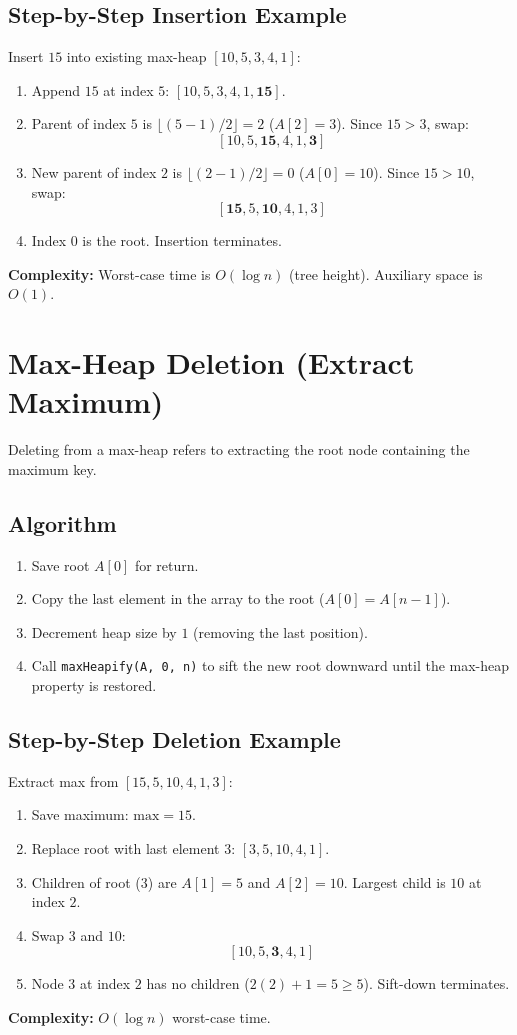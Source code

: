 \subsection{Step-by-Step Insertion Example}
Insert $15$ into existing max-heap $[10, 5, 3, 4, 1]$:
\begin{enumerate}
    \item Append $15$ at index $5$: $[10, 5, 3, 4, 1, \mathbf{15}]$.
    \item Parent of index $5$ is $\lfloor(5-1)/2\rfloor = 2$ ($A[2] = 3$). Since $15 > 3$, swap:
    \[
    [10, 5, \mathbf{15}, 4, 1, \mathbf{3}]
    \]
    \item New parent of index $2$ is $\lfloor(2-1)/2\rfloor = 0$ ($A[0] = 10$). Since $15 > 10$, swap:
    \[
    [\mathbf{15}, 5, \mathbf{10}, 4, 1, 3]
    \]
    \item Index $0$ is the root. Insertion terminates.
\end{enumerate}
\textbf{Complexity:} Worst-case time is $O(\log n)$ (tree height). Auxiliary space is $O(1)$.

\section{Max-Heap Deletion (Extract Maximum)}

Deleting from a max-heap refers to extracting the root node containing the maximum key.

\subsection{Algorithm}
\begin{enumerate}
    \item Save root $A[0]$ for return.
    \item Copy the last element in the array to the root ($A[0] = A[n-1]$).
    \item Decrement heap size by $1$ (removing the last position).
    \item Call \texttt{maxHeapify(A, 0, n)} to sift the new root downward until the max-heap property is restored.
\end{enumerate}

\subsection{Step-by-Step Deletion Example}
Extract max from $[15, 5, 10, 4, 1, 3]$:
\begin{enumerate}
    \item Save maximum: $\text{max} = 15$.
    \item Replace root with last element $3$: $[3, 5, 10, 4, 1]$.
    \item Children of root ($3$) are $A[1] = 5$ and $A[2] = 10$. Largest child is $10$ at index $2$.
    \item Swap $3$ and $10$:
    \[
    [10, 5, \mathbf{3}, 4, 1]
    \]
    \item Node $3$ at index $2$ has no children ($2(2)+1 = 5 \geq 5$). Sift-down terminates.
\end{enumerate}
\textbf{Complexity:} $O(\log n)$ worst-case time.

